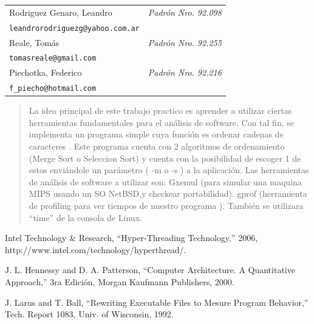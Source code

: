 \begin{flushleft}
{\renewcommand{\arraystretch}{2.5}
\renewcommand{\tabcolsep}{1.2cm}
\begin{tabular}{ l l }
  Rodriguez Genaro, Leandro & \textit{Padrón Nro. 92.098} \\
  \texttt{leandrorodriguezg@yahoo.com.ar} \\
  \hline
  Reale, Tomás & \textit{Padrón Nro. 92.255} \\
  \texttt{tomasreale@gmail.com} \\
  \hline
  Piechotka, Federico & \textit{Padrón Nro. 92.216} \\
  \texttt{f\_piecho@hotmail.com} \\
  \hline
\end{tabular}}
\end{flushleft}


\thispagestyle{empty}

\newpage

\begin{abstract}
La idea principal de este trabajo practico es aprender a utilizar ciertas herramientas fundamentales
para el análisis de software. Con tal fin, se implementa un programa simple cuya función es ordenar	
cadenas de caracteres . Este programa cuenta con 2 algoritmos de ordenamiento 
(Merge Sort o Seleccion Sort) y cuenta con la posibilidad de escoger 1 de estos enviándole un parámetro ( -m o -s ) a la aplicación.
Las herramientas de análisis de software a utilizar son:   
Gxemul (para simular una maquina MIPS usando un SO NetBSD,y checkear portabilidad).
gprof (herramienta de profiling para ver tiempos de nuestro programa ).
También se utilizara “time” de la consola de Linux.
\end{abstract}





\begin{thebibliography}{99}

 Intel Technology \& Research, ``Hyper-Threading Technology,'' 2006, http://www.intel.com/technology/hyperthread/.

 J. L. Hennessy and D. A. Patterson, ``Computer Architecture. A Quantitative
Approach,'' 3ra Edición, Morgan Kaufmann Publishers, 2000.

 J. Larus and T. Ball, ``Rewriting Executable Files to Mesure Program Behavior,'' Tech. Report 1083, Univ. of Wisconsin, 1992.

\end{thebibliography}


